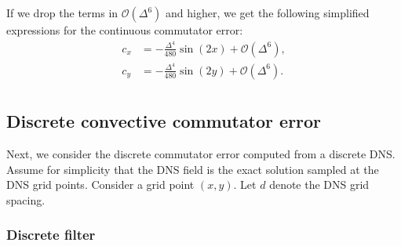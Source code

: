 \documentclass[preprint]{elsarticle}
\begin{document}
If we drop the terms in $\mathcal{O}(\Delta^6)$ and higher, we get the following simplified expressions for the continuous commutator error:
\begin{equation}
    \begin{split}
        c_x & = -\frac{\Delta^4}{480} \sin(2 x)  + \mathcal{O}(\Delta^6), \\
        c_y & = -\frac{\Delta^4}{480} \sin(2 y)  + \mathcal{O}(\Delta^6). \\
    \end{split}
\end{equation}

\subsection{Discrete convective commutator error}

Next, we consider the discrete commutator error computed
from a discrete DNS. Assume for simplicity that the DNS field is the
exact solution sampled at the DNS grid points. Consider a grid point $(x, y)$.
Let $d$ denote the DNS grid spacing.

\subsubsection{Discrete filter}
\end{document}
